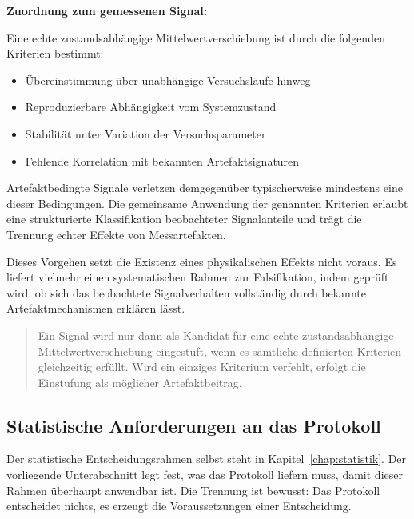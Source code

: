 \documentclass[12pt,a4paper]{report}
\begin{document}
\textbf{Zuordnung zum gemessenen Signal:}

Eine echte zustandsabhängige Mittelwertverschiebung ist durch die
folgenden Kriterien bestimmt:

\begin{itemize}
    \item Übereinstimmung über unabhängige Versuchsläufe hinweg
    \item Reproduzierbare Abhängigkeit vom Systemzustand
    \item Stabilität unter Variation der Versuchsparameter
    \item Fehlende Korrelation mit bekannten Artefaktsignaturen
\end{itemize}

\vspace{0.5em}

Artefaktbedingte Signale verletzen demgegenüber typischerweise
mindestens eine dieser Bedingungen. Die gemeinsame Anwendung der
genannten Kriterien erlaubt eine strukturierte Klassifikation
beobachteter Signalanteile und trägt die Trennung echter Effekte von
Messartefakten.

\vspace{0.5em}

Dieses Vorgehen setzt die Existenz eines physikalischen Effekts nicht
voraus. Es liefert vielmehr einen systematischen Rahmen zur Falsifikation,
indem geprüft wird, ob sich das beobachtete Signalverhalten vollständig
durch bekannte Artefaktmechanismen erklären lässt.

\begin{quote}
Ein Signal wird nur dann als Kandidat für eine echte zustandsabhängige
Mittelwertverschiebung eingestuft, wenn es sämtliche definierten
Kriterien gleichzeitig erfüllt. Wird ein einziges Kriterium verfehlt,
erfolgt die Einstufung als möglicher Artefaktbeitrag.
\end{quote}

\subsection{Statistische Anforderungen an das Protokoll}

Der statistische Entscheidungsrahmen selbst steht in
Kapitel~\ref{chap:statistik}. Der vorliegende Unterabschnitt legt fest,
was das Protokoll liefern muss, damit dieser Rahmen überhaupt anwendbar
ist. Die Trennung ist bewusst: Das Protokoll entscheidet nichts, es
erzeugt die Voraussetzungen einer Entscheidung.
\end{document}
